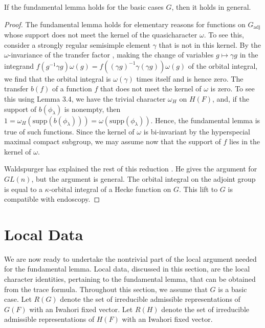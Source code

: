 \documentclass{amsart}
\newenvironment{cthm}[1]
  {\renewcommand\thethm{\sc #1}\thm}
  {\endthm}
\begin{document}
\begin{cthm}{Lemma 3.8}  If the fundamental lemma holds for
the basic cases $G$,
then it holds in general.
\end{cthm}

\begin{proof}  The fundamental lemma holds for elementary
reasons for functions on $G_{\text{adj}}$ whose support
does not meet the kernel of the quasicharacter $\omega$.  
To see this, consider
a strongly regular semisimple element $\gamma$ that is not
in this kernel.  By the $\omega$-invariance of the transfer
factor \cite{KS1}, making the change of variables $g\mapsto\gamma g$
in the integrand $f(g^{-1}\gamma g)\omega(g)
    = f((\gamma g)^{-1}\gamma (\gamma g))\omega(g)$
of the orbital integral,
we find that the orbital integral
is $\omega(\gamma)$ times itself and is hence zero.
The transfer $b(f)$ of a function $f$ that does not meet
the kernel of $\omega$ is zero.  
To see this using Lemma 3.4, we have the trivial character $\omega_H$
on $H(F)$, and, if the support of $b(\phi_\lambda)$ is nonempty,
then 
$1 = \omega_H(\text{supp}(b(\phi_\lambda))) = \omega(\text{supp}(\phi_\lambda))$.
Hence, the fundamental lemma is
true of such functions.  Since the kernel of $\omega$ is bi-invariant
by the hyperspecial maximal compact subgroup, we may assume now
that the support of $f$ lies in the kernel of $\omega$.

Waldspurger has explained the rest of this reduction \cite{W,3.1.2}.  He
gives the argument for $GL(n)$, but the argument is general.
The orbital integral on the adjoint group is equal 
to a $\kappa$-orbital integral of a 
Hecke function on $G$.  This lift to $G$ is compatible with endoscopy.
\end{proof}


\section{Local Data}%

We are now ready to undertake the nontrivial part of the local argument
needed for the fundamental lemma. 
Local data, discussed in this section, are the local character
identities,
 pertaining to the fundamental lemma, that can be obtained
from the trace formula.  Throughout this section, we assume
that $G$ is a basic case.
 Let $R(G)$ denote the set of 
 irreducible admissible representations of
 $G(F)$ with an Iwahori fixed vector.  Let $R(H)$ denote the set 
 of irreducible admissible representations of $H(F)$ with an
 Iwahori fixed vector.
\end{document}

